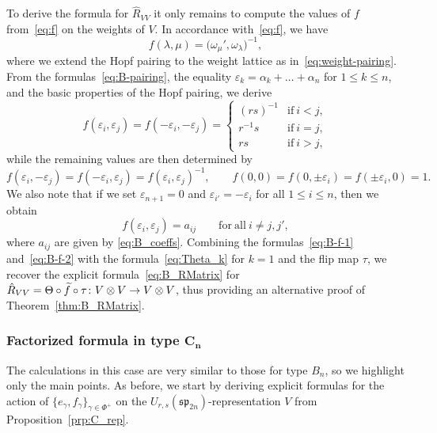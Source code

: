 \documentclass[10pt,a4paper]{amsart}
\numberwithin{equation}{section}
\newcommand{\ssp}{\mathfrak{sp}}
\begin{document}
To derive the formula for $\hat{R}_{VV}$ it only remains to compute the values of $f$ from~\eqref{eq:f} on the weights of $V$. In accordance with~\eqref{eq:f}, we have
\begin{displaymath}
 f(\lambda,\mu) = \bigl(\omega_{\mu}',\omega_{\lambda}\bigr)^{-1},
\end{displaymath}
where we extend the Hopf pairing to the weight lattice as in~\eqref{eq:weight-pairing}.
From the formulas~\eqref{eq:B-pairing}, the equality $\varepsilon_k=\alpha_{k}+\dots+\alpha_n$  for $1\leq k\leq n$, and the basic properties of the Hopf pairing, we derive
\begin{equation}\label{eq:B-f-1}
 f(\varepsilon_{i},\varepsilon_{j}) = f(-\varepsilon_{i},-\varepsilon_{j}) =
 \begin{cases}
 (rs)^{-1} & \text{if}\ i < j ,\\
 r^{-1}s & \text{if}\ i = j, \\
 rs & \text{if}\ i > j,
 \end{cases}
\end{equation}
while the remaining values are then determined by
\begin{equation}\label{eq:B-f-2}
 f(\varepsilon_{i},-\varepsilon_{j}) = f(-\varepsilon_{i},\varepsilon_{j}) = f(\varepsilon_{i},\varepsilon_{j})^{-1},\qquad
 f(0,0) = f(0, \pm \varepsilon_{i}) = f(\pm \varepsilon_{i},0) = 1.
\end{equation}
We also note that if we set $\varepsilon_{n+1} = 0$ and $\varepsilon_{i'} = -\varepsilon_{i}$ for all $1 \le i \le n$, then we obtain
\begin{equation}\label{eq:f_aij_B}
 f(\varepsilon_{i},\varepsilon_{j}) = a_{ij} \qquad \mathrm{for\ all} \ i \neq j,j',
\end{equation}
where $a_{ij}$ are given by \eqref{eq:B_coeffs}. Combining the formulas~\eqref{eq:B-f-1} and~\eqref{eq:B-f-2} with the formula~\eqref{eq:Theta_k} for $k=1$ and the flip map $\tau$, we recover the explicit formula~\eqref{eq:B_RMatrix} for $\smash{\hat{R}_{VV}=\Theta \circ \widetilde{f}} \circ \tau\colon V \otimes V \to V \otimes V$, thus providing an alternative proof of Theorem~\ref{thm:B_RMatrix}.

\subsubsection[Factorized formula in type C\_n]{Factorized formula in type $\boldsymbol{C_{n}}$}

The calculations in this case are very similar to those for type $B_{n}$, so we highlight only the main points.
As before, we start by deriving explicit formulas for the action of $\{e_\gamma,f_\gamma\}_{\gamma\in \Phi^+}$ on the $U_{r,s}(\ssp_{2n})$-representation $V$ from Proposition~\ref{prp:C_rep}.
\end{document}
